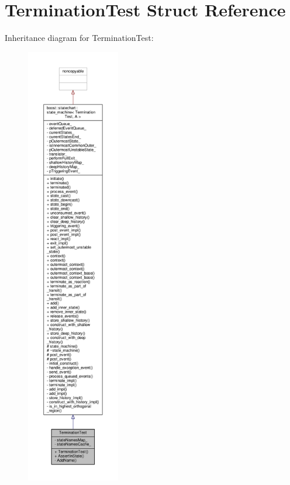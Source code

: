 \hypertarget{struct_termination_test}{}\section{Termination\+Test Struct Reference}
\label{struct_termination_test}


Inheritance diagram for Termination\+Test\+:
\nopagebreak
\begin{figure}[H]
\begin{center}
\leavevmode
\includegraphics[height=550pt]{struct_termination_test__inherit__graph}
\end{center}
\end{figure}



